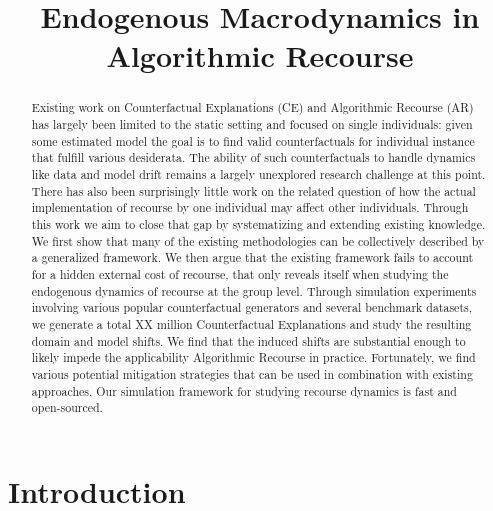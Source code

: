 \documentclass[
  conference]{IEEEtran}
\title{Endogenous Macrodynamics in Algorithmic Recourse}
\author{}
\date{}
\begin{document}
\maketitle
\begin{abstract}
Existing work on Counterfactual Explanations (CE) and Algorithmic
Recourse (AR) has largely been limited to the static setting and focused
on single individuals: given some estimated model the goal is to find
valid counterfactuals for individual instance that fulfill various
desiderata. The ability of such counterfactuals to handle dynamics like
data and model drift remains a largely unexplored research challenge at
this point. There has also been surprisingly little work on the related
question of how the actual implementation of recourse by one individual
may affect other individuals. Through this work we aim to close that gap
by systematizing and extending existing knowledge. We first show that
many of the existing methodologies can be collectively described by a
generalized framework. We then argue that the existing framework fails
to account for a hidden external cost of recourse, that only reveals
itself when studying the endogenous dynamics of recourse at the group
level. Through simulation experiments involving various popular
counterfactual generators and several benchmark datasets, we generate a
total XX million Counterfactual Explanations and study the resulting
domain and model shifts. We find that the induced shifts are substantial
enough to likely impede the applicability Algorithmic Recourse in
practice. Fortunately, we find various potential mitigation strategies
that can be used in combination with existing approaches. Our simulation
framework for studying recourse dynamics is fast and open-sourced.
\end{abstract}
\ifdefined\Shaded\renewenvironment{Shaded}{\begin{tcolorbox}[interior hidden, boxrule=0pt, sharp corners, frame hidden, breakable, borderline west={3pt}{0pt}{shadecolor}, enhanced]}{\end{tcolorbox}}\fi

\hypertarget{sec-intro}{%
\section{Introduction}\label{sec-intro}}
\end{document}
